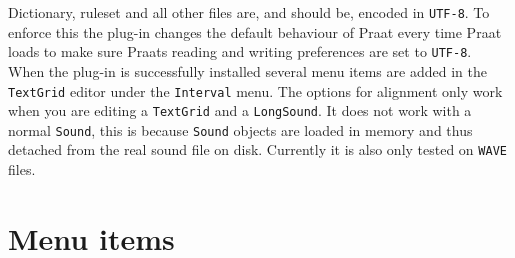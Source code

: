\documentclass[twoside,a4paper]{book}
\begin{document}
Dictionary, ruleset and all other files are, and should be, encoded in
\texttt{UTF-8}. To enforce this the plug-in changes the default behaviour of
Praat every time Praat loads to make sure Praats reading and
writing preferences are set to \texttt{UTF-8}.
When the plug-in is successfully installed several menu items are added in the
\texttt{TextGrid} editor under the \texttt{Interval} menu. The options for
alignment only work when you are editing a \texttt{TextGrid} and a
\texttt{LongSound}. It does not work with a normal \texttt{Sound}, this is
because \texttt{Sound} objects are loaded in memory and thus detached from the
real sound file on disk. Currently it is also only tested on \texttt{WAVE}
files.

\section{Menu items}
\end{document}
